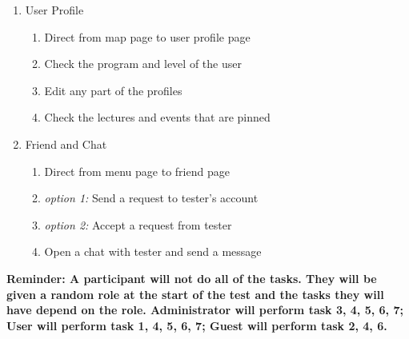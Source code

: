 \documentclass[12pt, titlepage]{article}
\begin{document}
\begin{enumerate}
\begin{enumerate}
\end{enumerate}
\item User Profile
\begin{enumerate}
\item Direct from map page to user profile page
\item Check the program and level of the user
\item Edit any part of the profiles
\item Check the lectures and events that are pinned
\end{enumerate}
\item Friend and Chat
\begin{enumerate}
\item Direct from menu page to friend page
\item \textit{option 1:} Send a request to tester's account
\item \textit{option 2:} Accept a request from tester
\item Open a chat with tester and send a message
\end{enumerate}
\end{enumerate}
\textbf{Reminder: A participant will not do all of the tasks. They will be given a random role at the start of the test and the tasks they will have depend on the role. Administrator will perform task 3, 4, 5, 6, 7; User will perform task 1, 4, 5, 6, 7; Guest will perform task 2, 4, 6.}
\end{document}
